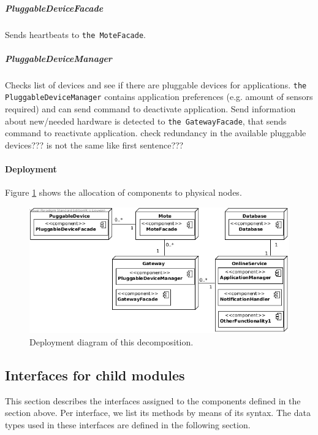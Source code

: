     \subparagraph{PluggableDeviceFacade}
        Sends heartbeats to \texttt{the MoteFacade}.

    \subparagraph{PluggableDeviceManager}
        Checks list of devices and see if there are pluggable devices for applications.
        \texttt{the PluggableDeviceManager} contains application preferences (e.g. amount of sensors required) and
        can send command to deactivate application.
        Send information about new/needed hardware is detected to \texttt{the GatewayFacade}, that sends command to
        reactivate application.
        check redundancy in the available pluggable devices??? is not the same like first sentence???


    \paragraph{Deployment}
        Figure \ref{fig:it1-depl_main} shows the allocation of components
        to physical nodes.

        \begin{figure}[!htp]
        	\centering
        	\includegraphics[width=1.00\textwidth]{deployment-diagram-1}
        	\caption{Deployment diagram of this decomposition.}\label{fig:it1-depl_main}
        \end{figure}


\subsection{Interfaces for child modules}\label{add1-interfaces}
    This section describes the interfaces assigned to the components defined
    in the section above. Per interface, we list its methods by means of its
    syntax. The data types used in these interfaces are defined in the following section. \\

